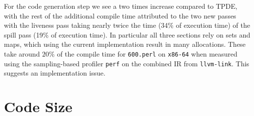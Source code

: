 For the code generation step we see a two times increase compared to TPDE, with the rest of the additional compile time attributed to the two new passes with the liveness pass  taking nearly twice the time (34\% of execution time) of the spill pass (19\% of execution time). In particular all three sections rely on sets and maps, which using the current implementation result in many allocations. These take around $20\%$ of the compile time for \texttt{600.perl} on \texttt{x86-64} when measured using the sampling-based profiler \texttt{perf} on the combined IR from \texttt{llvm-link}. This suggests an implementation issue.


\section{Code Size}

